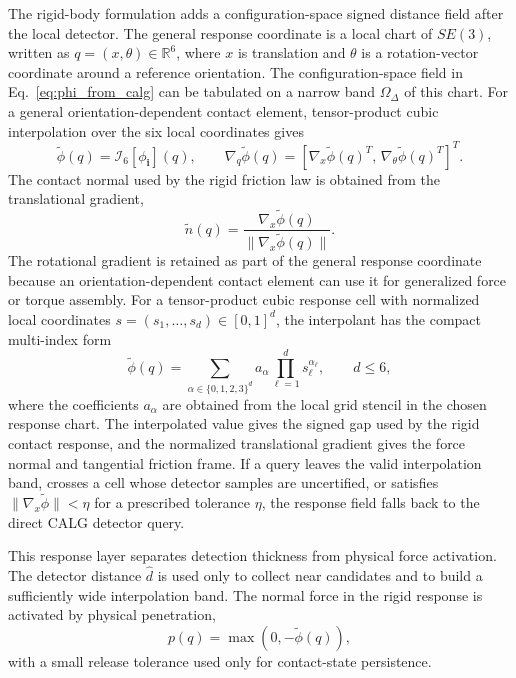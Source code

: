 \documentclass[preprint,12pt]{elsarticle}
\newcommand{\R}{\mathbb{R}}
\newcommand{\calg}{\textsc{CALG}}
\begin{document}
The rigid-body formulation adds a configuration-space signed distance field after the local detector. The general response coordinate is a local chart of $SE(3)$, written as $q=(x,\theta)\in\R^6$, where $x$ is translation and $\theta$ is a rotation-vector coordinate around a reference orientation. The configuration-space field in Eq.~\eqref{eq:phi_from_calg} can be tabulated on a narrow band $\Omega_\Delta$ of this chart. For a general orientation-dependent contact element, tensor-product cubic interpolation over the six local coordinates gives
\begin{equation}
    \tilde\phi(q)=\mathcal I_6[\phi_{\mathbf i}](q),
    \qquad
    \nabla_q\tilde\phi(q)=
    \left[
    \nabla_x\tilde\phi(q)^T,\,
    \nabla_\theta\tilde\phi(q)^T
    \right]^T .
    \label{eq:se3_sdf}
\end{equation}
The contact normal used by the rigid friction law is obtained from the translational gradient,
\begin{equation}
    \tilde n(q)=
    \frac{\nabla_x \tilde\phi(q)}
    {\|\nabla_x \tilde\phi(q)\|}.
    \label{eq:se3_sdf_normal}
\end{equation}
The rotational gradient is retained as part of the general response coordinate because an orientation-dependent contact element can use it for generalized force or torque assembly. For a tensor-product cubic response cell with normalized local coordinates $s=(s_1,\ldots,s_d)\in[0,1]^d$, the interpolant has the compact multi-index form
\begin{equation}
    \tilde\phi(q)=
    \sum_{\alpha\in\{0,1,2,3\}^{d}}
    a_{\alpha}\prod_{\ell=1}^{d}s_\ell^{\alpha_\ell},
    \qquad d\le 6,
    \label{eq:tricubic_poly}
\end{equation}
where the coefficients $a_\alpha$ are obtained from the local grid stencil in the chosen response chart. The interpolated value gives the signed gap used by the rigid contact response, and the normalized translational gradient gives the force normal and tangential friction frame. If a query leaves the valid interpolation band, crosses a cell whose detector samples are uncertified, or satisfies $\|\nabla_x\tilde\phi\|<\eta$ for a prescribed tolerance $\eta$, the response field falls back to the direct \calg{} detector query.

This response layer separates detection thickness from physical force activation. The detector distance $\hat d$ is used only to collect near candidates and to build a sufficiently wide interpolation band. The normal force in the rigid response is activated by physical penetration,
\begin{equation}
    p(q)=\max(0,-\tilde\phi(q)),
    \label{eq:sdf_penetration}
\end{equation}
with a small release tolerance used only for contact-state persistence.
\end{document}
